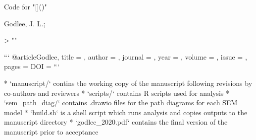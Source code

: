 Code for "[]()"

Godlee, J. L.; 

> ""

```
@article{Godlee,
  title = {},
  author = {},
  journal = {},
  year = ,
  volume = {},
  issue = {},
  pages = {}
  DOI = {}
}
```

* `manuscript/` contins the working copy of the manuscript following revisions by co-authors and reviewers 
* `scripts/` contains R scripts used for analysis
* `sem_path_diag/` contains .drawio files for the path diagrams for each SEM model
* `build.sh` is a shell script which runs analysis and copies outputs to the manuscript directory 
* `godlee_2020.pdf` contains the final version of the manuscript prior to acceptance


